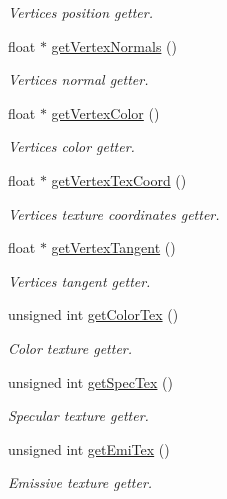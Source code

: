 \begin{DoxyCompactItemize}
\begin{DoxyCompactList}\small\item\em Vertices position getter. \end{DoxyCompactList}\item 
float $\ast$ \hyperlink{class_mesh_ab16f1115ed7865c9e7322c85e2d785af}{get\+Vertex\+Normals} ()
\begin{DoxyCompactList}\small\item\em Vertices normal getter. \end{DoxyCompactList}\item 
float $\ast$ \hyperlink{class_mesh_ade2dd22f7cbe37df8e51ba65c800bbc8}{get\+Vertex\+Color} ()
\begin{DoxyCompactList}\small\item\em Vertices color getter. \end{DoxyCompactList}\item 
float $\ast$ \hyperlink{class_mesh_ab6ba57a10fbed17d8f9dc8ec09b92657}{get\+Vertex\+Tex\+Coord} ()
\begin{DoxyCompactList}\small\item\em Vertices texture coordinates getter. \end{DoxyCompactList}\item 
float $\ast$ \hyperlink{class_mesh_ae5cd8d05ef13c4e71bea276a9783adaf}{get\+Vertex\+Tangent} ()
\begin{DoxyCompactList}\small\item\em Vertices tangent getter. \end{DoxyCompactList}\item 
unsigned int \hyperlink{class_mesh_a838bd5498ec781707bb28830ff5e064d}{get\+Color\+Tex} ()
\begin{DoxyCompactList}\small\item\em Color texture getter. \end{DoxyCompactList}\item 
unsigned int \hyperlink{class_mesh_ad4787ea15b5ad63eed00a1a0ef272637}{get\+Spec\+Tex} ()
\begin{DoxyCompactList}\small\item\em Specular texture getter. \end{DoxyCompactList}\item 
unsigned int \hyperlink{class_mesh_ad0b8c57f20a5319e2e730cfa61271904}{get\+Emi\+Tex} ()
\begin{DoxyCompactList}\small\item\em Emissive texture getter. \end{DoxyCompactList}\item 

\end{DoxyCompactItemize}
